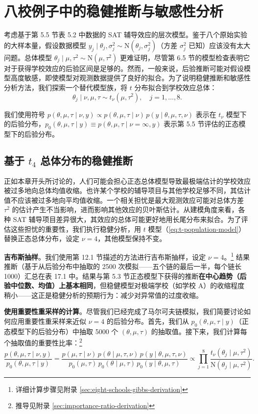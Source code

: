 \section{八校例子中的稳健推断与敏感性分析}

考虑基于第 5.5 节表 5.2 中数据的 SAT 辅导效应的层次模型。鉴于八个原始实验的大样本量，假设数据模型 $y_j \mid \theta_j, \sigma_j^2 \sim \mathrm{N}(\theta_j, \sigma_j^2)$（方差 $\sigma_j^2$ 已知）应该没有太大问题。总体模型 $\theta_j \mid \mu, \tau^2 \sim \mathrm{N}(\mu, \tau^2)$ 更难证明，尽管第 6.5 节的模型检查表明它对于获得学校效应的后验区间是足够的。然而，一般来说，后验推断可能对假设模型高度敏感，即使模型对观测数据提供了良好的拟合。为了说明稳健推断和敏感性分析方法，我们探索一个替代模型族，将 $t$ 分布拟合到学校效应总体：
\[
\theta_j \mid \nu, \mu, \tau \sim t_\nu(\mu, \tau^2), \quad j = 1, \ldots, 8.
\label{eq:t-population-model}
\]

我们使用符号 $p(\theta, \mu, \tau \mid \nu, y) \propto p(\theta, \mu, \tau \mid \nu) \, p(y \mid \theta, \mu, \tau, \nu)$ 表示在 $t_\nu$ 模型下的后验分布，$p_0(\theta, \mu, \tau \mid y) \equiv p(\theta, \mu, \tau \mid \nu = \infty, y)$ 表示第 5.5 节评估的正态模型下的后验分布。

\subsection{基于 $t_4$ 总体分布的稳健推断}

正如本章开头所讨论的，人们可能会担心正态总体模型导致最极端估计的学校效应被过多地向总体均值收缩。也许某个学校的辅导项目与其他学校足够不同，其估计值不应该被过多地向平均值收缩。一个相关担忧是最大观测效应可能对总体方差 $\tau^2$ 的估计产生不当影响，进而影响其他效应的贝叶斯估计。从建模角度来看，各种 SAT 辅导项目差异很大，其效应的总体可能更好地用长尾分布来拟合。为了评估这些担忧的重要性，我们执行稳健分析，用 $t$ 模型（\cref{eq:t-population-model}）替换正态总体分布，设定 $\nu = 4$，其他模型保持不变。

\textbf{吉布斯抽样}。我们使用第 12.1 节描述的方法进行吉布斯抽样，设定 $\nu = 4$。\footnote{详细计算步骤见附录 \cref{sec:eight-schools-gibbs-derivation}} 结果推断（基于从后验分布中抽取的 2500 次模拟——五个链的最后一半，每个链长 1000）汇总在表 17.1 中。结果与第 5.3 节正态模型下获得的推断\textbf{在中心趋势（后验中位数、均值）上基本相同}，但稳健模型对极端学校（如学校 A）的收缩程度稍小——这正是稳健分析的预期行为：减少对异常值的过度收缩。

\textbf{使用重要性重采样的计算}。尽管我们已经完成了马尔可夫链模拟，我们简要讨论如何应用重要性重采样来近似 $\nu = 4$ 的后验分布。首先，我们从 $p_0(\theta, \mu, \tau \mid y)$（正态模型下的后验分布）中抽取 5000 个 $(\theta, \mu, \tau)$ 的抽取值。接下来，我们计算每个抽取值的重要性比率：\footnote{推导见附录 \cref{sec:importance-ratio-derivation}}
\[
\frac{p(\theta, \mu, \tau \mid \nu, y)}{p_0(\theta, \mu, \tau \mid y)} = \frac{p(\mu, \tau \mid \nu) \, p(\theta \mid \mu, \tau, \nu) \, p(y \mid \theta, \mu, \tau, \nu)}{p_0(\mu, \tau) \, p_0(\theta \mid \mu, \tau) \, p_0(y \mid \theta, \mu, \tau)} \propto \prod_{j=1}^8 \frac{t_\nu(\theta_j \mid \mu, \tau^2)}{\mathrm{N}(\theta_j \mid \mu, \tau^2)}.
\label{eq:importance-ratio}
\]

